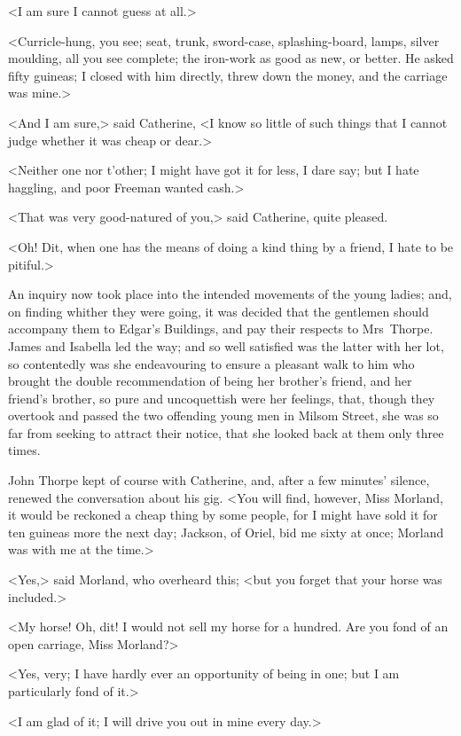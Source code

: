  <I am sure I cannot guess at all.> 

 <Curricle-hung, you see; seat, trunk, sword-case, splashing-board, lamps, silver moulding, all you see complete; the iron-work as good as new, or better. He asked fifty guineas; I closed with him directly, threw down the money, and the carriage was mine.> 

 <And I am sure,> said Catherine, <I know so little of such things that I cannot judge whether it was cheap or dear.> 

 <Neither one nor t'other; I might have got it for less, I dare say; but I hate haggling, and poor Freeman wanted cash.> 

 <That was very good-natured of you,> said Catherine, quite pleased. 

 <Oh! D\doubleemdash it, when one has the means of doing a kind thing by a friend, I hate to be pitiful.> 

 An inquiry now took place into the intended movements of the young ladies; and, on finding whither they were going, it was decided that the gentlemen should accompany them to Edgar's Buildings, and pay their respects to Mrs~Thorpe. James and Isabella led the way; and so well satisfied was the latter with her lot, so contentedly was she endeavouring to ensure a pleasant walk to him who brought the double recommendation of being her brother's friend, and her friend's brother, so pure and uncoquettish were her feelings, that, though they overtook and passed the two offending young men in Milsom Street, she was so far from seeking to attract their notice, that she looked back at them only three times. 

 John Thorpe kept of course with Catherine, and, after a few minutes' silence, renewed the conversation about his gig. <You will find, however, Miss Morland, it would be reckoned a cheap thing by some people, for I might have sold it for ten guineas more the next day; Jackson, of Oriel, bid me sixty at once; Morland was with me at the time.> 

 <Yes,> said Morland, who overheard this; <but you forget that your horse was included.> 

 <My horse! Oh, d\doubleemdash it! I would not sell my horse for a hundred. Are you fond of an open carriage, Miss Morland?> 

 <Yes, very; I have hardly ever an opportunity of being in one; but I am particularly fond of it.> 

 <I am glad of it; I will drive you out in mine every day.> 

